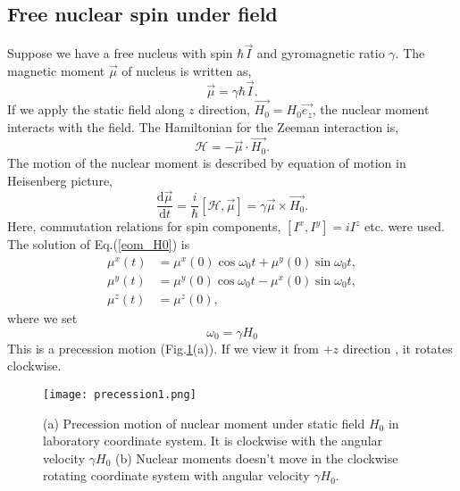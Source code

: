 \subsection{Free nuclear spin under field}
Suppose we have a free nucleus with spin $\hbar\vec{I}$ and gyromagnetic ratio $\gamma$.
The magnetic moment $\vec{\mu}$ of nucleus is written as,
\begin{equation}
\vec{\mu} = \gamma\hbar\vec{I}.
\end{equation}
If we apply the static field along $z$ direction, $\overrightarrow{H_0} = H_0\vec{e_z}$, the nuclear moment interacts with the field.
The Hamiltonian for the Zeeman interaction is,
\begin{equation}
\mathcal{H} = -\vec{\mu}\cdot\overrightarrow{H_0}.
\end{equation}
The motion of the nuclear moment is described by equation of motion in Heisenberg picture,
\begin{equation}
\frac{\mathrm{d}\vec{\mu}}{\mathrm{d}t} = \frac{i}{\hbar}[\mathcal{H},\vec{\mu}] = \gamma\vec{\mu}\times\overrightarrow{H_0}.
\label{eom_H0}
\end{equation}
Here, commutation relations for spin components, $[I^x, I^y] = iI^z$ etc. were used.
The solution of Eq.(\ref{eom_H0}) is
\begin{align}
\mu^x (t) &= \mu^x(0)\cos\omega_0t + \mu^y(0)\sin\omega_0t,\\
\mu^y (t) &= \mu^y(0)\cos\omega_0t - \mu^x(0)\sin\omega_0t,\\
\mu^z (t) &= \mu^z(0),
\end{align}
where we set
\begin{equation}
\omega_0 = \gamma H_0
\end{equation}
This is a precession motion (Fig.\ref{precession1}(a)).
If we view it from $+z$ direction , it rotates clockwise.

\begin{figure}
  \centering
  \texttt{[image: precession1.png]}
  \caption{(a) Precession motion of nuclear moment under static field $H_0$ in laboratory coordinate system.
  It is clockwise with the angular velocity $\gamma H_0$
  (b) Nuclear moments doesn't move in the clockwise rotating coordinate system with angular velocity $\gamma H_0$.}
  \label{precession1}
\end{figure}


